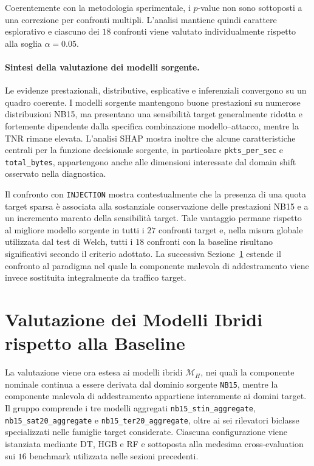 Coerentemente con la metodologia sperimentale, i $p$-value non sono sottoposti a una correzione per confronti multipli. 
L'analisi mantiene quindi carattere esplorativo e ciascuno dei $18$ confronti viene valutato individualmente rispetto alla soglia $\alpha=0.05$.

\paragraph{Sintesi della valutazione dei modelli sorgente.}
Le evidenze prestazionali, distributive, esplicative e inferenziali convergono su un quadro coerente. 
I modelli sorgente mantengono buone prestazioni su numerose distribuzioni NB15, ma presentano una sensibilità target generalmente ridotta e fortemente dipendente dalla specifica combinazione modello--attacco, mentre la TNR rimane elevata. 
L'analisi SHAP mostra inoltre che alcune caratteristiche centrali per la funzione decisionale sorgente, in particolare \texttt{pkts\_per\_sec} e \texttt{total\_bytes}, appartengono anche alle dimensioni interessate dal domain shift osservato nella diagnostica.

Il confronto con \texttt{INJECTION} mostra contestualmente che la presenza di una quota target sparsa è associata alla sostanziale conservazione delle prestazioni NB15 e a un incremento marcato della sensibilità target. 
Tale vantaggio permane rispetto al migliore modello sorgente in tutti i $27$ confronti target e, nella misura globale utilizzata dal test di Welch, tutti i $18$ confronti con la baseline risultano significativi secondo il criterio adottato. 
La successiva Sezione~\ref{sec:risultati_modelli_ibridi} estende il confronto al paradigma nel quale la componente malevola di addestramento viene invece sostituita integralmente da traffico target.




\section{Valutazione dei Modelli Ibridi rispetto alla Baseline}
\label{sec:risultati_modelli_ibridi}

La valutazione viene ora estesa ai modelli ibridi $\mathcal{M}_{H}$, nei quali la componente nominale continua a essere derivata dal dominio sorgente \texttt{NB15}, mentre la componente malevola di addestramento appartiene interamente ai domini target. 
Il gruppo comprende i tre modelli aggregati \texttt{nb15\_stin\_aggregate}, \texttt{nb15\_sat20\_aggregate} e \texttt{nb15\_ter20\_aggregate}, oltre ai sei rilevatori biclasse specializzati nelle famiglie target considerate. 
Ciascuna configurazione viene istanziata mediante DT, HGB e RF e sottoposta alla medesima cross-evaluation sui $16$ benchmark utilizzata nelle sezioni precedenti.

